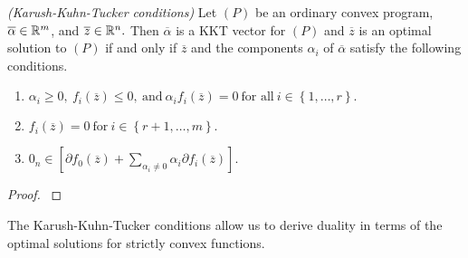 \begin{ftheorem}
  \emph{(Karush-Kuhn-Tucker conditions)}
  Let $(P)$
  be an ordinary convex program,
  $
  \overline{\alpha}
  \in \mathbb{R}^m
  $,
   and 
   $
   \overline{z}
   \in \mathbb{R}^n.
   $
   Then 
   $
  \overline{\alpha}
   $
   is a KKT vector for $(P)$
   and 
   $
   \overline{z}
   $
   is an optimal solution to $(P)$
   if and only if 
   $
   \overline{z}
   $
   and 
   the components $\alpha_i$ of
   $
  \overline{\alpha}
   $
   satisfy 
   the following conditions.

  \begin{enumerate}[label={(\roman*)}]
    \item
      $
        \alpha_i \ge 0,
        \ 
        f_i(
   \overline{z}
        )
        \le 0,
        \ 
        \text{and}
        \ 
        \alpha_i 
        f_i(
   \overline{z}
        )
        =0
        \ 
        \text{for all}
        \ 
        i\in \left\{ 1, \ldots, r \right\}
        .
      $
      \item
        $
        f_i(
   \overline{z}
        )
        =0
        \ 
        \text{for}
        \ 
        i\in \left\{ r+1, \ldots, m \right\}
        .
        $
      \item
        $
         0
         _n
         \in 
         [
          \partial
        f_0(
   \overline{z}
        )
        +
        \sum_{\alpha_i\neq 0}
        \alpha_i 
        \partial
        f_i(
   \overline{z}
        )
         ]
.
        $
  \end{enumerate}
\end{ftheorem}
\begin{proof}
  \cite[Theorem~28.3]{Rockafellar1970}
\end{proof}

\begin{takeaways}
  The Karush-Kuhn-Tucker conditions allow us
  to derive duality in terms of the optimal solutions
  for strictly convex functions.
\end{takeaways}
